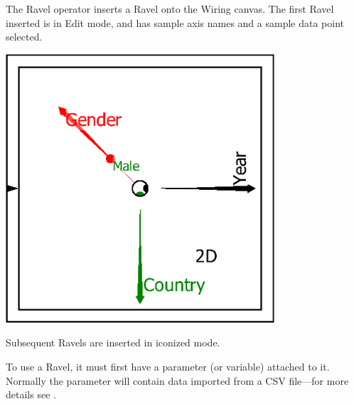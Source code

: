 The Ravel operator inserts a
Ravel onto the Wiring canvas. The first Ravel inserted is in Edit
mode, and has sample axis names and a sample data point selected.

\includegraphics[width=10cm]{images/RavelBlank}

Subsequent Ravels are inserted in iconized mode.


To use a Ravel, it must first have a parameter (or variable) attached
to it. Normally the parameter will contain data imported from a CSV
file---for more details see .

